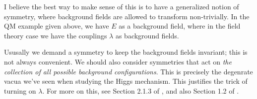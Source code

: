 \documentclass[a4paper
	,10pt
]{article}
\begin{document}
	I believe the best way to make sense of this is to have a generalized notion of symmetry, where background fields are allowed to transform non-trivially. In the QM example given above, we have $E$ as a background field, where in the field theory case we have the couplings $\lambda$ as background fields. 
	
	Ususally we demand a symmetry to keep the background fields invariant; this is not always convenient. We should also consider symmetries that act on \textit{the collection of all possible background configurations}. This is precisely the degenrate vacua we've seen when studying the Higgs mechanism. This justifies the trick of turning on $\lambda$. For more on this, see Section 2.1.3 of \textcite{Banados:2016zim}, and also Section 1.2 of \cite{Lai:2021abc}. 
	
	
\vspace{1.2\baselineskip}
\pagebreak[4]
\raggedright
\printbibliography[%
	,heading = bibintoc
]
\end{document}
